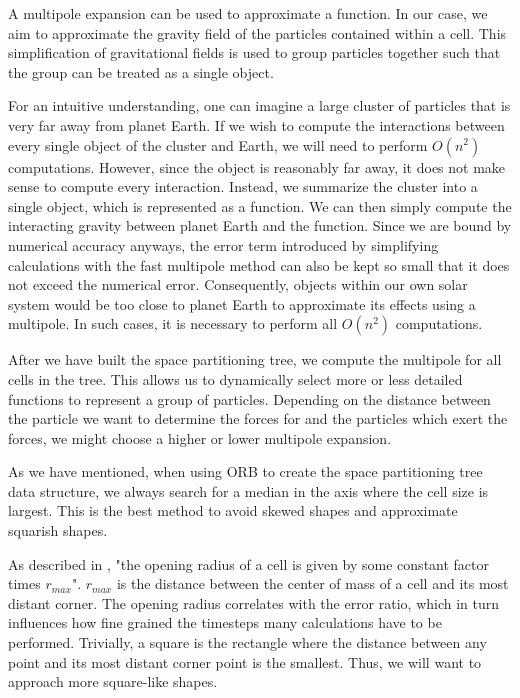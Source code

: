 \documentclass[]{article}
\begin{document}
A multipole expansion can be used to approximate a function. In our case, we aim to approximate the gravity field of the particles contained within a cell. This simplification of gravitational fields is used to group particles together such that the group can be treated as a single object. 

For an intuitive understanding, one can imagine a large cluster of particles that is very far away from planet Earth. If we wish to compute the interactions between every single object of the cluster and Earth, we will need to perform $O(n^2)$ computations. However, since the object is reasonably far away, it does not make sense to compute every interaction. Instead, we summarize the cluster into a single object, which is represented as a function. We can then simply compute the interacting gravity between planet Earth and the function. Since we are bound by numerical accuracy anyways, the error term introduced by simplifying calculations with the fast multipole method can also be kept so small that it does not exceed the numerical error. Consequently, objects within our own solar system would be too close to planet Earth to approximate its effects using a multipole. In such cases, it is necessary to perform all $O(n^2)$ computations.

After we have built the space partitioning tree, we compute the multipole for all cells in the tree. This allows us to dynamically select more or less detailed functions to represent a group of particles. Depending on the distance between the particle we want to determine the forces for and the particles which exert the forces, we might choose a higher or lower multipole expansion.

As we have mentioned, when using ORB to create the space partitioning tree data structure, we always search for a median in the axis where the cell size is largest. This is the best method to avoid skewed shapes and approximate squarish shapes. 

As described in \cite{Stadel2001}, "the opening radius of a cell is given by some constant factor times $r_{max}$". $r_{max}$ is the distance between the center of mass of a cell and its most distant corner. The opening radius correlates with the error ratio, which in turn influences how fine grained the timesteps many calculations have to be performed. Trivially, a square is the rectangle where the distance between any point and its most distant corner point is the smallest. Thus, we will want to approach more square-like shapes.
\end{document}
